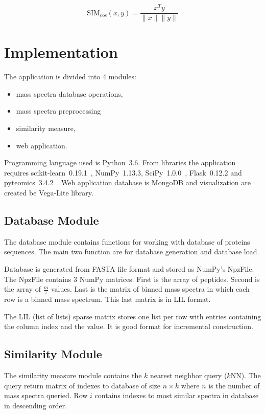 \documentclass[a4paper,10pt,twocolumn]{article}
\begin{document}
\[ \text{SIM}_{\cos}(x, y) = \frac{x^Ty}{\|x\|\|y\|} \]

\section{Implementation}

The application is divided into 4 modules:

\begin{itemize}
    \item mass spectra database operations,
    \item mass spectra preprocessing
    \item similarity measure,
    \item web application.
\end{itemize}

Programming language used is Python~3.6. From libraries the application requires
scikit-learn~0.19.1~\cite{scikit-learn}, NumPy~1.13.3,
SciPy~1.0.0~\cite{scipy}, Flask~0.12.2 and
pyteomics~3.4.2~\cite{Goloborodko2013}. Web application database is MongoDB 
and visualization are created be Vega-Lite library.

\subsection{Database Module}

The database module contains functions for working with database of
proteins sequences. The main two function are for database generation and
database load.

Database is generated from FASTA file format and stored as NumPy's NpzFile.
The NpzFile contains 3 NumPy matrices. First is the array of peptides.
Second is the array of \(\frac{m}{z}\) values. Last is the matrix of binned
mass spectra in which each row is a binned mass spectrum. This last
matrix is in LIL format.

The LIL (list of lists) sparse matrix stores one list per row with entries
containing the column index and the value. It is good format for incremental
construction.

\subsection{Similarity Module}

The similarity measure module contains the \(k\) nearest neighbor query 
(\(k\)NN). The query return matrix of indexes to database of size
\(n \times k\) where \(n\) is the number of mass spectra queried.
Row \(i\) contains indexes to most similar spectra in database in
descending order.
\end{document}
